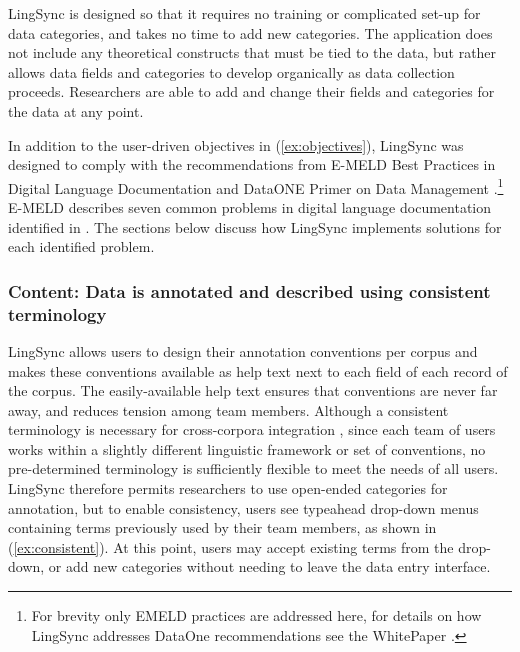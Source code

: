 \documentclass[letterpaper, 12pt, dvips]{mitwpl}
\begin{document}
\noindent LingSync is designed so that it requires no training or complicated set-up for data categories, and takes no time to add new categories.  The application does not include any theoretical constructs that must be tied to the data, but rather allows data fields and categories to develop organically as data collection proceeds. Researchers are able to add and change their fields and categories for the data at any point. 



In addition to the user-driven objectives in (\ref{ex:objectives}), LingSync was designed to comply with the recommendations from %
E-MELD Best Practices in Digital Language Documentation \citep{EMELD:2006:Online} and %
DataONE Primer on Data Management \citep{DataOne:2011:Online}.\footnote{For brevity only EMELD practices are addressed here, for details on how LingSync addresses DataOne recommendations  see the WhitePaper \citep{LingSync:2012}.}
E-MELD describes seven common problems in digital language documentation identified in \cite{Bird:2003}. The sections below discuss how LingSync implements solutions for each identified problem.


\subsubsection{\textbf{Content}: Data is annotated and described using consistent terminology} 

LingSync allows users to design their annotation conventions per corpus and makes these conventions available as help text next to each field of each record of the corpus. The easily-available help text ensures that conventions are never far away, and reduces tension among team members.
Although a consistent  terminology is necessary for cross-corpora integration  \citep{Schalley:2012}, since each team of users works within a slightly different linguistic framework or set of conventions, no pre-determined terminology is sufficiently flexible to meet the needs of all users. LingSync therefore permits researchers to use open-ended categories for annotation, but 
to enable consistency, users see typeahead drop-down menus containing terms previously used by their team members, as shown in (\ref{ex:consistent}). At this point, users may accept existing terms from the drop-down, or add new categories without needing to leave the data entry interface.
\end{document}
